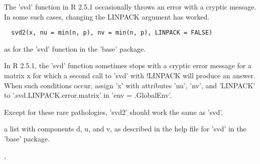 \begin{Description}\relax
The 'svd' function in R 2.5.1 occasionally throws an error
with a cryptic message.  In some such cases, changing the
LINPACK argument has worked.
\end{Description}
\begin{Usage}
\begin{verbatim}
  svd2(x, nu = min(n, p), nv = min(n, p), LINPACK = FALSE)
\end{verbatim}
\end{Usage}
\begin{Arguments}
\begin{ldescription}
\item[\code{x, nu, nv, LINPACK}] as for the 'svd' function in the 'base' package.

\end{ldescription}
\end{Arguments}
\begin{Details}\relax
In R 2.5.1, the 'svd' function sometimes stops with a cryptic error
message for a matrix x for which a second call to 'svd' with !LINPACK
will produce an answer.  When such conditions occur, assign 'x' with
attributes 'nu', 'nv', and 'LINPACK' to '.svd.LINPACK.error.matrix'
in 'env = .GlobalEnv'.

Except for these rare pathologies, 'svd2' should work the same as
'svd'.
\end{Details}
\begin{Value}
a list with components d, u, and v, as described in the help file for
'svd' in the 'base' package.
\end{Value}
\begin{SeeAlso}\relax
{},
\end{SeeAlso}

